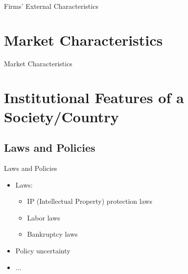 \documentclass{beamer}
\begin{document}
    \begin{frame}{Firms' External Characteristics}

    \end{frame}

    \section[Market Char.]{Market Characteristics}

    \begin{frame}{Market Characteristics}
        
    \end{frame}
    
    \section[Institutional Features]{Institutional Features of a Society/Country}

    \subsection{Laws and Policies}

    \begin{frame}{Laws and Policies}
        \vspace{-1cm}
        \begin{itemize}
            \item Laws:
            \begin{itemize}
                \item IP (Intellectual Property) protection laws
                \item Labor laws
                \item Bankruptcy laws
            \end{itemize}
            \item Policy uncertainty
            \item ...
        \end{itemize}
    \end{frame}
\end{document}
